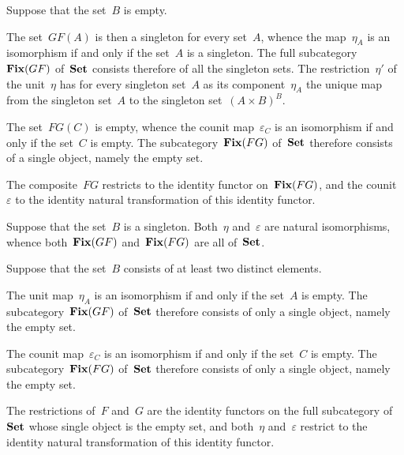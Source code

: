 \begin{casedistinction}

	\item
		Suppose that the set~$B$ is empty.

		The set~$GF(A)$ is then a singleton for every set~$A$, whence the map~$η_A$ is an isomorphism if and only if the set~$A$ is a singleton.
		The full subcategory~$\mathop{\mathbf{Fix}}(GF)$ of~$\mathbf{Set}$ consists therefore of all the singleton sets.
		The restriction~$η'$ of the unit~$η$ has for every singleton set~$A$ as its component~$η_A$ the unique map from the singleton set~$A$ to the singleton set~$(A × B)^B$.

		The set~$FG(C)$ is empty, whence the counit map~$ε_C$ is an isomorphism if and only if the set~$C$ is empty.
		The subcategory~$\mathop{\mathbf{Fix}}(FG)$ of~$\mathbf{Set}$ therefore consists of a single object, namely the empty set.

		The composite~$FG$ restricts to the identity functor on~$\mathop{\mathbf{Fix}}(FG)$, and the counit~$ε$ to the identity natural transformation of this identity functor.

	\item
		Suppose that the set~$B$ is a singleton.
		Both~$η$ and~$ε$ are natural isomorphisms, whence both~$\mathop{\mathbf{Fix}}(GF)$ and~$\mathop{\mathbf{Fix}}(FG)$ are all of~$\mathbf{Set}$.

	\item
		Suppose that the set~$B$ consists of at least two distinct elements.

		The unit map~$η_A$ is an isomorphism if and only if the set~$A$ is empty.
		The subcategory~$\mathop{\mathbf{Fix}}(GF)$ of~$\mathbf{Set}$ therefore consists of only a single object, namely the empty set.

		The counit map~$ε_C$ is an isomorphism if and only if the set~$C$ is empty.
		The subcategory~$\mathop{\mathbf{Fix}}(FG)$ of~$\mathbf{Set}$ therefore consists of only a single object, namely the empty set.

		The restrictions of~$F$ and~$G$ are the identity functors on the full subcategory of~$\mathbf{Set}$ whose single object is the empty set, and both~$η$ and~$ε$ restrict to the identity natural transformation of this identity functor.

\end{casedistinction}
